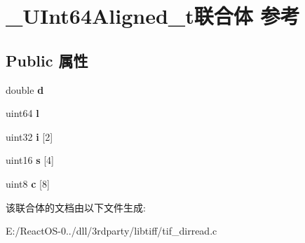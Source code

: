 \hypertarget{union___u_int64_aligned__t}{}\section{\+\_\+\+U\+Int64\+Aligned\+\_\+t联合体 参考}
\label{union___u_int64_aligned__t}
\subsection*{Public 属性}
\begin{DoxyCompactItemize}
\item 
\mbox{\label{union___u_int64_aligned__t_a8af4d717ef34a79058a5a13ecb92d518}} 
double {\bfseries d}
\item 
\mbox{\label{union___u_int64_aligned__t_ac7268fb3871b2a1ef86d6feaaf119bce}} 
uint64 {\bfseries l}
\item 
\mbox{\label{union___u_int64_aligned__t_ab0fb98ea911c6738b66f28e5db1a8d71}} 
uint32 {\bfseries i} \mbox{[}2\mbox{]}
\item 
\mbox{\label{union___u_int64_aligned__t_ab8d2797ec0a91d1114cb4b0569a49726}} 
uint16 {\bfseries s} \mbox{[}4\mbox{]}
\item 
\mbox{\label{union___u_int64_aligned__t_a25246debb0165f8efd6c9c109b136cd8}} 
uint8 {\bfseries c} \mbox{[}8\mbox{]}
\end{DoxyCompactItemize}


该联合体的文档由以下文件生成\+:\begin{DoxyCompactItemize}
\item 
E\+:/\+React\+O\+S-\/0../dll/3rdparty/libtiff/tif\+\_\+dirread.\+c\end{DoxyCompactItemize}
